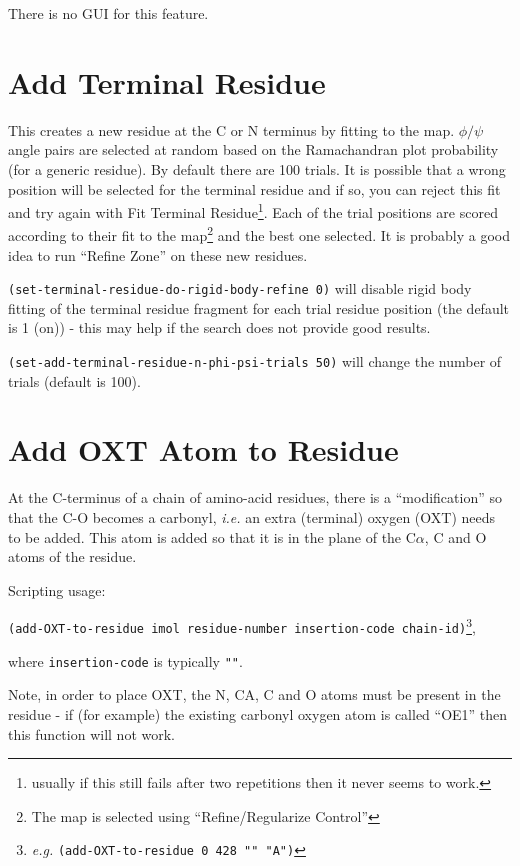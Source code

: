 \documentclass{book}
\begin{document}
There is no GUI for this feature.

\section{Add Terminal Residue}
 This creates a new residue at the C or N
terminus by fitting to the map.  $\phi/\psi$ angle pairs are selected
at random based on the Ramachandran plot probability (for a generic
residue).  By default there are 100 trials.  It is possible that a
wrong position will be selected for the terminal residue and if so,
you can reject this fit and try again with Fit Terminal
Residue\footnote{usually if this still fails after two repetitions
  then it never seems to work.}. Each of the trial positions are
scored according to their fit to the map\footnote{The map is selected
  using ``Refine/Regularize Control''} and the best one selected.  It
is probably a good idea to run ``Refine Zone'' on these new residues.

\texttt{(set-terminal-residue-do-rigid-body-refine 0)} will disable
rigid body fitting of the terminal residue fragment for
each trial residue position (the default is 1 (on)) - this may help if
the search does not provide good results.

\texttt{(set-add-terminal-residue-n-phi-psi-trials 50)} will change
the number of trials (default is 100).

\section{Add OXT Atom to Residue}
At the
C-terminus of a chain of amino-acid residues, there
is a ``modification'' so that the C-O becomes a carbonyl, \emph{i.e.}
an extra (terminal) oxygen (OXT) needs to be added.  This atom is
added so that it is in the plane of the C$\alpha$, C and O atoms of
the residue.

Scripting usage:

\texttt{(add-OXT-to-residue imol residue-number \newline insertion-code
  chain-id)}\footnote{\emph{e.g.} \texttt{(add-OXT-to-residue 0 428 "" "A")}}, 

where \texttt{insertion-code} is typically \texttt{""}.  

Note, in order to place OXT, the N, CA, C and O atoms must be present
in the residue - if (for example) the existing carbonyl oxygen atom is
called ``OE1'' then this function will not work.
\end{document}
